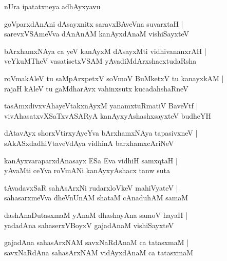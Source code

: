 \documentclass[twoside,12pt,openright]{book}
\newcounter{shloka}[chapter]
\begin{document}
\begin{center}
nUra ipatatxneya adhAyxyavu
\end{center}
	
\begin{shloka}%
goVparxdAnAni dAsayxnitx saravxBAveVna suvarxtaH |\\
sarevxVSAmeVva dAnAnAM kanAyxdAnaM vishiSayxteV 
\end{shloka}

\begin{shloka}%
bArxhamxNAya ca yeV kanAyxM dAsayxMti vidhivananxrAH |\\
veYkuMTheV vasatisetxVSAM yAvadiMdArxshacxtudaRsha 
\end{shloka}

\begin{shloka}%
roVmakAleV tu saMpArxpetxV soVmoV BuMketxV tu kanayxkAM |\\
rajaH kAleV tu gaMdharAvx vahinxsutx kucadahshaRneV
\end{shloka}

\begin{shloka}%
tasAmxdivxvAhayeVtakxnAyxM yanamxtuRmatiV BaveVtf |\\
vivAhasatxvXSaTxvASARyA kanAyxyAshashxsayxteV budheYH 
\end{shloka}

\begin{shloka}%
dAtavAyx shorxVtirxyAyeYva bArxhamxNAya tapasivxneV |\\
sAkASxdadhiVtaveVdAya vidhinA barxhamxcAriNeV 
\end{shloka}

\begin{shloka}%
kanAyxvaraparxdAnasayx ESa Eva vidhiH samxqtaH |\\
yAvaMti ceYva roVmANi kanAyxyAshacx tanw suta 
\end{shloka}

\begin{shloka}%
tAvadavxSaR sahAsArxNi rudarxloVkeV mahiVyateV |\\
sahasarxmeVva dheVnUnAM shataM cAnaduhAM samaM 
\end{shloka}

\begin{shloka}%
dashAnaDutasxmaM yAnaM dhashayAna samoV hayaH |\\
yadadAna sahaserxVBoyxV gajadAnaM vishiSayxteV 
\end{shloka}

\begin{shloka}%
gajadAna sahasArxNAM savxNaRdAnaM ca tatasxmaM |\\
savxNaRdAna sahasArxNAM vidAyxdAnaM ca tatasxmaM 
\end{shloka}
\end{document}

